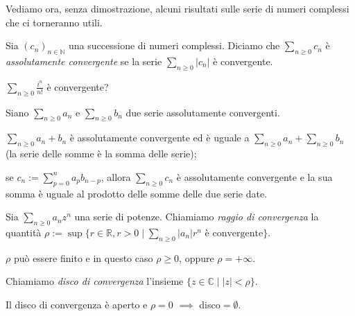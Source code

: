 Vediamo ora, senza dimostrazione, alcuni risultati sulle serie di numeri complessi che ci torneranno utili.

\begin{defn}
  Sia $(c_n)_{n \in \mathbb{N}}$ una successione di numeri complessi. Diciamo che $\displaystyle \sum_{n \ge 0} c_n$ è \textit{assolutamente convergente} se la serie $\displaystyle \sum_{n \ge 0} |c_n|$ è convergente.
\end{defn}

\begin{exc}
  $\displaystyle \sum_{n \ge 0} \frac{i^n}{n!}$ è convergente?
\end{exc}

\begin{prop} \label{sum&prod}
  Siano $\displaystyle \sum_{n \ge 0} a_n$ e $\displaystyle \sum_{n \ge 0} b_n$ due serie assolutamente convergenti.
  \begin{nlist}
    \item $\displaystyle \sum_{n \ge 0} a_n+b_n$ è assolutamente convergente ed è uguale a $\displaystyle \sum_{n \ge 0} a_n + \sum_{n \ge 0} b_n$ (la serie delle somme è la somma delle serie);
    \item se $\displaystyle c_n:=\sum_{p=0}^n a_pb_{n-p}$, allora $\displaystyle \sum_{n \ge 0} c_n$ è assolutamente convergente e la sua somma è uguale al prodotto delle somme delle due serie date.
  \end{nlist}
\end{prop}

\begin{defn}
  Sia $\displaystyle \sum_{n \ge 0} a_nz^n$ una serie di potenze. Chiamiamo \textit{raggio di convergenza} la quantità $\displaystyle \rho:=\sup\{r \in \mathbb{R}, r>0 \mid \sum_{n \ge 0} |a_n|r^n \text{ è convergente}\}$.
\end{defn}

\begin{oss}
  $\rho$ può essere finito e in questo caso $\rho \ge 0$, oppure $\rho=+\infty$.
\end{oss}

\begin{defn}
  Chiamiamo \textit{disco di convergenza} l'insieme $\{z \in \mathbb{C} \mid |z|<\rho\}$.
\end{defn}

\begin{oss}
  Il disco di convergenza è aperto e $\rho=0$ $\implies$ disco$=\emptyset$.
\end{oss}

